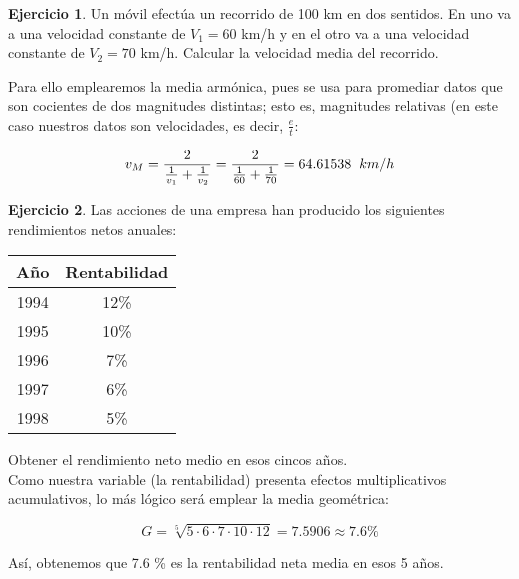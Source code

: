 \documentclass[a4paper, 12pt]{article}
\theoremstyle{definition}
\newtheorem{ej}{Ejercicio}
\begin{document}
\begin{ej}
Un móvil efectúa un recorrido de 100 km en dos sentidos. En uno va a una velocidad constante de \(V_1 = 60\) km/h y en el otro va a una velocidad constante de \(V_2 = 70\) km/h. Calcular la velocidad media del recorrido. 
\newline

Para ello emplearemos la media armónica, pues se usa para promediar datos que son cocientes de dos magnitudes distintas; esto es, magnitudes relativas (en este caso nuestros datos son velocidades, es decir, \(\frac{e}{t}\):

\[
v_M = \frac{2}{\frac{1}{v_1} + \frac{1}{v_2}} = \frac{2}{\frac{1}{60} + \frac{1}{70}} = 64.61538 \hspace{0.2cm} km/h
\]
\end{ej}

\begin{ej}
Las acciones de una empresa han producido los siguientes rendimientos netos anuales:

\begin{center}
    \begin{tabular}{c c}
         Año & Rentabilidad  \\
         \hline
         1994 & 12\% \\
         1995 & 10\% \\
         1996 & 7\% \\
         1997 & 6\% \\
         1998 & 5\%
    \end{tabular}
\end{center}

Obtener el rendimiento neto medio en esos cincos años. \\

Como nuestra variable (la rentabilidad) presenta efectos multiplicativos acumulativos, lo más lógico será emplear la media geométrica:

\[
G = \sqrt[5]{5 \cdot 6 \cdot 7 \cdot 10 \cdot 12} = 7.5906 \approx 7.6 \% 
\]

Así, obtenemos que 7.6 \% es la rentabilidad neta media en esos 5 años.
\end{ej}
\end{document}
